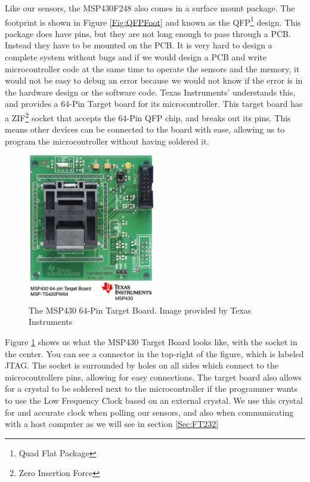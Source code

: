 Like our sensors, the MSP430F248 also comes in a surface mount package. The footprint is shown in Figure \ref{Fig:QFPFoot} and known as the QFP\footnote{Quad Flat Package} design. This package does have pins, but they are not long enough to pass through a PCB. Instead they have to be mounted on the PCB. It is very hard to design a complete system without bugs and if we would design a PCB and write microcontroller code at the same time to operate the sensors and the memory, it would not be easy to debug an error because we would not know if the error is in the hardware design or the software code. Texas Instruments' understands this, and provides a 64-Pin Target board for its microcontroller. This target board has a ZIF\footnote{Zero Insertion Force} socket that accepts the 64-Pin QFP chip, and breaks out its pins. This means other devices can be connected to the board with ease, allowing us to program the microcontroller without having soldered it.
\begin{figure}
\begin{center}
\includegraphics[width=0.5\textwidth]{images/mspts430pm64.jpg}
\caption{The MSP430 64-Pin Target Board. Image provided by Texas Instruments}
\label{Fig:MSPTarget}
\end{center}
\end{figure}

Figure \ref{Fig:MSPTarget} shows us what the MSP430 Target Board looks like, with the socket in the center. You can see a connector in the top-right of the figure, which is labeled JTAG. The socket is surrounded by holes on all sides which connect to the microcontrollers pins, allowing for easy connections. The target board also allows for a crystal to be soldered next to the microcontroller if the programmer wants to use the Low Frequency Clock based on an external crystal. We use this crystal for and accurate clock when polling our sensors, and also when communicating with a host computer as we will see in section \ref{Sec:FT232}


